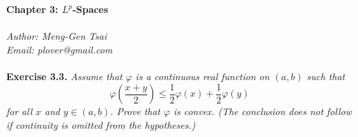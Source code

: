 \documentclass{article}
\begin{document}
\textbf{\Large Chapter 3: $L^p$-Spaces} \\\\



\emph{Author: Meng-Gen Tsai} \\
\emph{Email: plover@gmail.com} \\\\






\textbf{Exercise 3.3.}
\emph{Assume that $\varphi$ is a continuous real function on $(a,b)$ such that
\[
  \varphi\left(\frac{x+y}{2}\right)
  \leq
  \frac{1}{2} \varphi(x) + \frac{1}{2} \varphi(y)
\]
for all $x$ and $y \in (a,b)$.
Prove that $\varphi$ is convex.
(The conclusion does not follow if continuity is omitted from the hypotheses.)} \\
\end{document}
